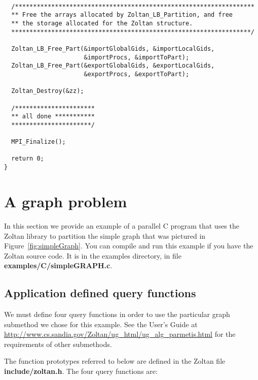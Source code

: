 \clearpage
\begin{flushleft}
\begin{verbatim}

  /******************************************************************
  ** Free the arrays allocated by Zoltan_LB_Partition, and free
  ** the storage allocated for the Zoltan structure.
  ******************************************************************/

  Zoltan_LB_Free_Part(&importGlobalGids, &importLocalGids, 
                      &importProcs, &importToPart);
  Zoltan_LB_Free_Part(&exportGlobalGids, &exportLocalGids, 
                      &exportProcs, &exportToPart);

  Zoltan_Destroy(&zz);

  /**********************
  ** all done ***********
  **********************/

  MPI_Finalize();

  return 0;
}

\end{verbatim}
\end{flushleft}

\clearpage
\section{A graph problem}

In this section we provide an example of a parallel C program
that uses the Zoltan library to partition the simple graph that
was pictured in Figure~\ref{fig:simpleGraph}.  You can compile
and run this example if you have the Zoltan source code.  It is
in the examples directory, in file \textbf{examples/C/simpleGRAPH.c}.

\subsection{Application defined query functions}

We must define four query functions in order to use the
particular graph submethod we chose for this example.  See the
User's Guide at
\url{http://www.cs.sandia.gov/Zoltan/ug_html/ug_alg_parmetis.html} for
the requirements of other submethods.

The function prototypes referred to below
are defined in the Zoltan file \textbf{include/zoltan.h}.
The four query functions are:

